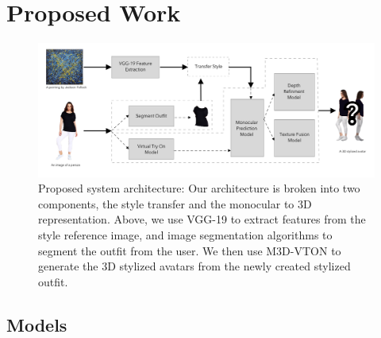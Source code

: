 \documentclass{article}
\begin{document}


\section{Proposed Work}


\begin{figure}[H]
    \centering
    \includegraphics[width=\textwidth]{report/diagrams/3d_sari.png}
    \caption{Proposed system architecture: Our architecture is broken into two components, the style transfer and the monocular to 3D representation. Above, we use VGG-19 to extract features from the style reference image, and image segmentation algorithms to segment the outfit from the user. We then use M3D-VTON to generate the 3D stylized avatars from the newly created stylized outfit.}
\end{figure}

\subsection{Models}
\end{document}

